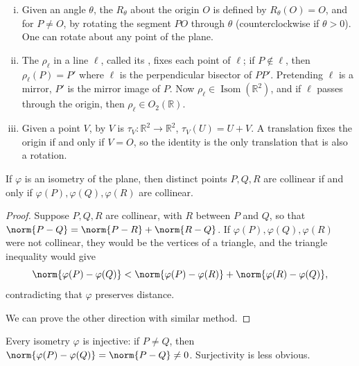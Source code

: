 \begin{eg}\label{eg:isometries}
	\begin{enumerate}[(i)]
		\item Given an angle \(\theta\), the  \(R_\theta\) about the origin
		      \(O\) is defined by \(R_\theta(O) = O\), and for \(P \neq O\), by rotating the
		      segment \(PO\) through \(\theta\) (counterclockwise if \(\theta > 0\)). One can
		      rotate about any point of the plane.
		\item The  \(\rho_\ell\) in a line \(\ell\), called its
		      , fixes each point of \(\ell\); if \(P \notin \ell\), then
		      \(\rho_\ell(P) = P'\) where \(\ell\) is the perpendicular bisector of
		      \(PP'\). Pretending \(\ell\) is a mirror, \(P'\) is the mirror image of \(P\).
		      Now \(\rho_\ell \in \operatorname{Isom}(\mathbb{R}^2)\), and if \(\ell\) passes
		      through the origin, then \(\rho_\ell \in O_2(\mathbb{R})\).
		\item Given a point \(V\),  by \(V\) is
		      \(\tau_V\colon \mathbb{R}^2 \to \mathbb{R}^2\), \(\tau_V(U) = U + V\). A
		      translation fixes the origin if and only if \(V = O\), so the identity is the
		      only translation that is also a rotation.
	\end{enumerate}
\end{eg}

\begin{lemma}\label{lem:isometry-collinear}
	If \(\varphi\) is an isometry of the plane, then distinct points \(P, Q, R\) are
	collinear if and only if \(\varphi(P), \varphi(Q), \varphi(R)\) are collinear.
\end{lemma}

\begin{proof}
	Suppose \(P, Q, R\) are collinear, with \(R\) between \(P\) and \(Q\), so that
	\(\norm{P-Q} = \norm{P-R} + \norm{R-Q}\). If \(\varphi(P), \varphi(Q), \varphi(R)\) were
	not collinear, they would be the vertices of a triangle, and the triangle inequality
	would give
	\[
		\norm{\varphi(P)-\varphi(Q)} < \norm{\varphi(P)-\varphi(R)} + \norm{\varphi(R)-\varphi(Q)},
	\]
	contradicting that \(\varphi\) preserves distance.

    We can prove the other direction with similar method.
\end{proof}

Every isometry \(\varphi\) is injective: if \(P \neq Q\), then
\(\norm{\varphi(P)-\varphi(Q)} = \norm{P-Q} \neq 0\). Surjectivity is less obvious.

